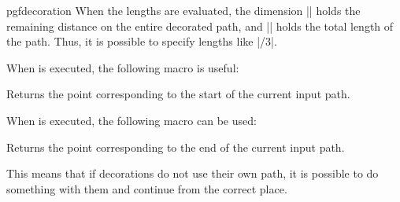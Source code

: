 \begin{environment}{{pgfdecoration}}
    When the lengths are evaluated, the dimension
    |\pgfdecoratedremainingdistance| holds the remaining distance on the entire
    decorated path, and |\pgfdecoratedpathlength| holds the total length of the
    path. Thus, it is possible to specify lengths like
    |\pgfdecoratedpathlength/3|.
\begin{codeexample}[preamble={\usetikzlibrary{decorations,decorations.pathmorphing}}]
\end{codeexample}

    When  is executed, the following macro is useful:
    \begin{command}{\pgfpointdecoratedpathfirst}
        Returns the point corresponding to the start of the current input path.
    \end{command}
    When  is executed, the following macro can be used:
    \begin{command}{\pgfpointdecoratedpathlast}
        Returns the point corresponding to the end of the current input path.
    \end{command}
    This means that if decorations do not use their own path, it is possible to
    do something with them and continue from the correct place.
\begin{codeexample}[preamble={\usetikzlibrary{decorations,decorations.pathmorphing}}]
\end{codeexample}


\end{environment}
